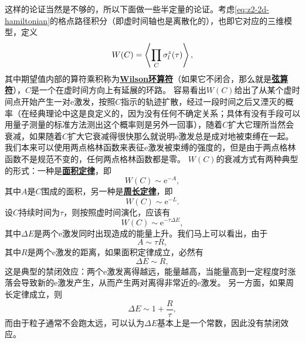 \documentclass[hyperref, UTF8, a4paper]{ctexart}
\newcommand*{\ee}{\mathrm{e}}
\newcommand*{\concept}[1]{\underline{\textbf{#1}}}
\begin{document}
这样的论证当然是不够的，所以下面做一些半定量的论证。考虑\eqref{eq:z2-2d-hamiltonian}的格点路径积分（即虚时间轴也是离散化的），也即它对应的三维模型，定义
\begin{equation}
    W(C) = \expval{\prod_C \sigma^z_l(\tau)},
\end{equation}
其中期望值内部的算符乘积称为\concept{Wilson环算符}（如果它不闭合，那么就是\concept{弦算符}），$C$是一个在虚时间方向上有延展的环路。
容易看出$W(C)$给出了从某个虚时间点开始产生一对e激发，按照$C$指示的轨迹扩散，经过一段时间之后又湮灭的概率（在经典理论中这是良定义的，因为没有任何不确定关系；具体有没有手段可以用量子测量的标准方法测出这个概率则是另外一回事），随着$C$扩大它理所当然会衰减，如果随着$C$扩大它衰减得很快那么就说明e激发总是成对地被束缚在一起。
我们本来可以使用两点格林函数来表征e激发被束缚的强度的，但是由于两点格林函数不是规范不变的，任何两点格林函数都是零。
$W(C)$的衰减方式有两种典型的形式：一种是\concept{面积定律}，即
\begin{equation}
    W(C) \sim \ee^{-A},
\end{equation}
其中$A$是$C$围成的面积，另一种是\concept{周长定律}，即
\begin{equation}
    W(C) \sim \ee^{-L}.
\end{equation}
设$C$持续时间为$\tau$，则按照虚时间演化，应该有
\[
    W(C) \sim \ee^{-\tau \Delta E},
\]
其中$\Delta E$是两个e激发同时出现造成的能量上升。我们马上可以看出，由于
\[
    A \sim \tau R,
\]
其中$R$是两个e激发的距离，如果面积定律成立，必然有
\[
    \Delta E \sim R,
\]
这是典型的禁闭效应：两个e激发离得越远，能量越高，当能量高到一定程度时涨落会导致新的e激发产生，从而产生两对离得非常近的e激发。
另一方面，如果周长定律成立，则
\[
    \Delta E \sim 1 + \frac{R}{\tau},
\]
而由于粒子通常不会跑太远，可以认为$\Delta E$基本上是一个常数，因此没有禁闭效应。
\end{document}
